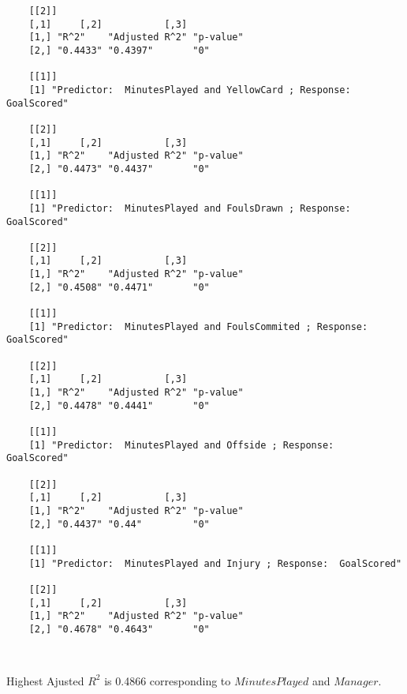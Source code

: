 \documentclass[12pt]{article}
\begin{document}
\begin{verbatim}
	[[2]]
	[,1]     [,2]           [,3]     
	[1,] "R^2"    "Adjusted R^2" "p-value"
	[2,] "0.4433" "0.4397"       "0"      
	
	[[1]]
	[1] "Predictor:  MinutesPlayed and YellowCard ; Response:  GoalScored"
	
	[[2]]
	[,1]     [,2]           [,3]     
	[1,] "R^2"    "Adjusted R^2" "p-value"
	[2,] "0.4473" "0.4437"       "0"      
	
	[[1]]
	[1] "Predictor:  MinutesPlayed and FoulsDrawn ; Response:  GoalScored"
	
	[[2]]
	[,1]     [,2]           [,3]     
	[1,] "R^2"    "Adjusted R^2" "p-value"
	[2,] "0.4508" "0.4471"       "0"      
	
	[[1]]
	[1] "Predictor:  MinutesPlayed and FoulsCommited ; Response:  GoalScored"
	
	[[2]]
	[,1]     [,2]           [,3]     
	[1,] "R^2"    "Adjusted R^2" "p-value"
	[2,] "0.4478" "0.4441"       "0"      
	
	[[1]]
	[1] "Predictor:  MinutesPlayed and Offside ; Response:  GoalScored"
	
	[[2]]
	[,1]     [,2]           [,3]     
	[1,] "R^2"    "Adjusted R^2" "p-value"
	[2,] "0.4437" "0.44"         "0"      
	
	[[1]]
	[1] "Predictor:  MinutesPlayed and Injury ; Response:  GoalScored"
	
	[[2]]
	[,1]     [,2]           [,3]     
	[1,] "R^2"    "Adjusted R^2" "p-value"
	[2,] "0.4678" "0.4643"       "0"      
	
		
	\end{verbatim}
	
	Highest Ajusted $ R^2 $ is 0.4866 corresponding to $ MinutesPlayed $ and $ Manager $.
	
\end{document}
